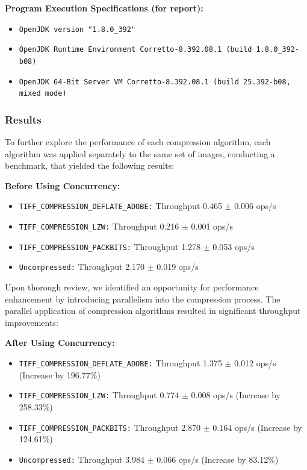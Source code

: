 \documentclass[sigconf]{acmart}
\begin{document}
\textbf{Program Execution Specifications (for report):}
\begin{itemize}
  \item \texttt{OpenJDK version "1.8.0\_392"}
  \item \texttt{OpenJDK Runtime Environment Corretto-8.392.08.1 (build 1.8.0\_392-b08)}
  \item \texttt{OpenJDK 64-Bit Server VM Corretto-8.392.08.1 (build 25.392-b08, mixed mode)}
\end{itemize}

\subsubsection{Results}
To further explore the performance of each compression algorithm, each algorithm was applied separately to the same set of images, conducting a benchmark, that yielded the following results: \vspace{12pt}

\textbf{Before Using Concurrency:}
\begin{itemize}
    \item \texttt{TIFF\_COMPRESSION\_DEFLATE\_ADOBE:} Throughput 0.465 $\pm$ 0.006 ops/s
    \item \texttt{TIFF\_COMPRESSION\_LZW:} Throughput 0.216 $\pm$ 0.001 ops/s
    \item \texttt{TIFF\_COMPRESSION\_PACKBITS:} Throughput 1.278 $\pm$ 0.053 ops/s
    \item \texttt{Uncompressed:} Throughput 2.170 $\pm$ 0.019 ops/s
\end{itemize}

Upon thorough review, we identified an opportunity for performance enhancement by introducing parallelism into the compression process. The parallel application of compression algorithms resulted in significant throughput improvements:\vspace{12pt}

\textbf{After Using Concurrency:}
\begin{itemize}
    \item \texttt{TIFF\_COMPRESSION\_DEFLATE\_ADOBE:} Throughput 1.375 $\pm$ 0.012 ops/s (Increase by 196.77\%)
    \item \texttt{TIFF\_COMPRESSION\_LZW:} Throughput 0.774 $\pm$ 0.008 ops/s (Increase by 258.33\%)
    \item \texttt{TIFF\_COMPRESSION\_PACKBITS:} Throughput 2.870 $\pm$ 0.164 ops/s (Increase by 124.61\%)
    \item \texttt{Uncompressed:} Throughput 3.984 $\pm$ 0.066 ops/s (Increase by 83.12\%)
\end{itemize}
\end{document}
